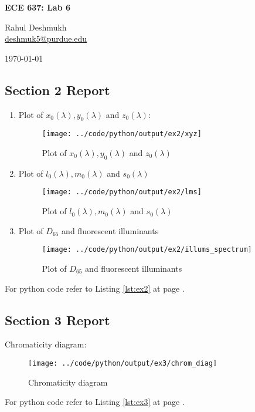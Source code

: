 \documentclass[a4paper,11pt]{article}
\newcommand{\reflst}[1]{Listing \ref{#1} at page \pageref{#1}}
\begin{document}
\begin{center}
\Large{\textbf{ECE 637: Lab 6}}

Rahul Deshmukh\\\href{mailto:deshmuk5@purdue.edu}{{\color{blue}deshmuk5@purdue.edu}}

\today
\end{center}

\subsection*{Section 2 Report} 
\begin{enumerate}
\item Plot of $x_0(\lambda),y_0(\lambda)$ and $z_0(\lambda)$:
 \begin{figure}[!hp]
  \centering
  \texttt{[image: ../code/python/output/ex2/xyz]}
  \caption{Plot of $x_0(\lambda),y_0(\lambda)$ and $z_0(\lambda)$}
 \end{figure}

\clearpage
\item Plot of $l_0(\lambda),m_0(\lambda)$ and $s_0(\lambda)$
\begin{figure}[!hp]
  \centering
  \texttt{[image: ../code/python/output/ex2/lms]}
  \caption{Plot of $l_0(\lambda),m_0(\lambda)$ and $s_0(\lambda)$}
 \end{figure}

\clearpage
\item Plot of $D_{65}$ and fluorescent illuminants
\begin{figure}[!hp]
  \centering
  \texttt{[image: ../code/python/output/ex2/illums\_spectrum]}
  \caption{Plot of $D_{65}$ and fluorescent illuminants}
  \label{fig:illums}
 \end{figure}
\end{enumerate}
For python code refer to \reflst{lst:ex2}.

\clearpage
\subsection*{Section 3 Report} 
Chromaticity diagram:
\begin{figure}[!hp]
  \centering
  \texttt{[image: ../code/python/output/ex3/chrom\_diag]}
  \caption{Chromaticity diagram}
 \end{figure}
For python code refer to \reflst{lst:ex3}.
%  
\end{document}
